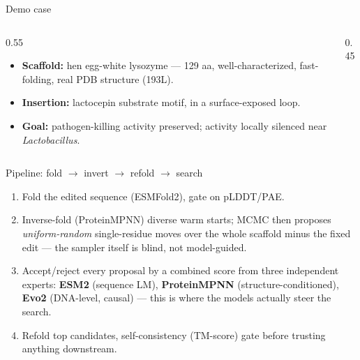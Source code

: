 \documentclass[aspectratio=169]{beamer}
\begin{document}
\begin{frame}{Demo case}
  \begin{columns}
    \begin{column}{0.55\textwidth}
      \begin{itemize}
        \item \textbf{Scaffold:} hen egg-white lysozyme --- 129 aa,
          well-characterized, fast-folding, real PDB structure (193L).
        \item \textbf{Insertion:} lactocepin substrate motif, in a
          surface-exposed loop.
        \item \textbf{Goal:} pathogen-killing activity preserved; activity
          locally silenced near \emph{Lactobacillus}.
      \end{itemize}
    \end{column}
    \begin{column}{0.45\textwidth}
      \centering
    \end{column}
  \end{columns}
\end{frame}

\begin{frame}{Pipeline: fold $\to$ invert $\to$ refold $\to$ search}
  \begin{enumerate}
    \item Fold the edited sequence (ESMFold2), gate on pLDDT/PAE.
    \item Inverse-fold (ProteinMPNN) diverse warm starts; MCMC then proposes
      \emph{uniform-random} single-residue moves over the whole scaffold
      minus the fixed edit --- the sampler itself is blind, not model-guided.
    \item Accept/reject every proposal by a combined score from three
      independent experts: \textbf{ESM2} (sequence LM), \textbf{ProteinMPNN}
      (structure-conditioned), \textbf{Evo2} (DNA-level, causal) --- this is
      where the models actually steer the search.
    \item Refold top candidates, self-consistency (TM-score) gate before
      trusting anything downstream.
  \end{enumerate}
\end{frame}
\end{document}
